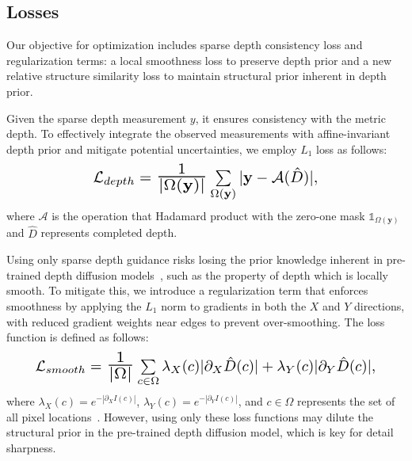 \subsection{Losses}
\label{sec:losses}
Our objective for optimization includes sparse depth consistency loss and regularization terms: a local smoothness loss to preserve depth prior and a new relative structure similarity loss to maintain structural prior inherent in depth prior.

Given the sparse depth measurement $y$, it ensures consistency with the metric depth.
To effectively integrate the observed measurements with affine-invariant depth prior and mitigate potential uncertainties, we employ $L_{1}$ loss as follows:
\begin{equation}
    \resizebox{0.59\hsize}{!}{$
    \mathcal{L}_{depth} = \scalebox{1.4}{$\frac{1}{|\Omega(\mathbf{y})|}$} \sum\limits_{\Omega(\mathbf{y})} |\mathbf{y}- \mathcal{A}(\hat{D})|,
    $}
\end{equation}
where $\mathcal{A}$ is the operation that Hadamard product with the zero-one mask $\mathds{1}_{\Omega(\mathbf{y})}$ and $\hat{D}$ represents completed depth.

Using only sparse depth guidance risks losing the prior knowledge inherent in pre-trained depth diffusion models~\cite{ke2023repurposing, gui2024depthfm}, such as the property of depth which is locally smooth.
To mitigate this, we introduce a regularization term that enforces smoothness by applying the $L_1$ norm to gradients in both the $X$ and $Y$ directions, with reduced gradient weights near edges to prevent over-smoothing.
The loss function is defined as follows:
\begin{equation}
    \resizebox{0.89\hsize}{!}{$
    \mathcal{L}_{smooth} =\scalebox{1.5}{$\frac{1}{|\Omega|}$} \sum\limits_{c\in\Omega} \lambda_X(c) |\partial_X \hat{D}(c)| + \lambda_Y(c) |\partial_Y \hat{D}(c)|,
    $}
\end{equation}
where $\lambda_X(c)=e^{-|\partial_X I(c)|}$, $\lambda_Y(c)=e^{-|\partial_Y I(c)|}$, and $c \in \Omega$ represents the set of all pixel locations~\cite{park2024testtime}.
However, using only these loss functions may dilute the structural prior in the pre-trained depth diffusion model, which is key for detail sharpness. 

